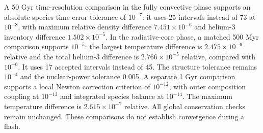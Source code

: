 A 50 Gyr time-resolution comparison in the fully convective phase supports
an absolute species time-error tolerance of $10^{-7}$: it uses 25 intervals
instead of 73 at $10^{-8}$, with maximum relative density difference
$7.451\times10^{-6}$ and helium-3 inventory difference $1.502\times10^{-5}$.
In the radiative-core phase, a matched 500 Myr comparison supports
$10^{-5}$: the largest temperature difference is $2.475\times10^{-6}$
relative and the total helium-3 difference is $2.766\times10^{-5}$ relative,
compared with $10^{-6}$. It uses 17 accepted intervals instead of 45.
The structure tolerance remains $10^{-4}$ and the nuclear-power tolerance
0.005. A separate 1 Gyr comparison supports a local Newton correction
criterion of $10^{-12}$, with outer composition coupling at $10^{-13}$ and
integrated species balance at $10^{-14}$. The maximum temperature difference
is $2.615\times10^{-7}$ relative. All global conservation checks remain
unchanged. These comparisons do not establish convergence during a flash.
